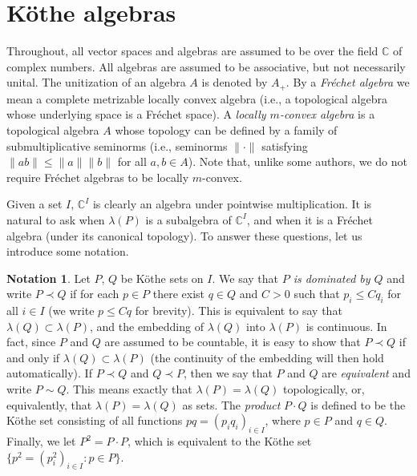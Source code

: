 \documentclass[12pt,reqno]{amsart}
\theoremstyle{definition}
\newtheorem*{notation}{Notation}
\begin{document}
\section{K\"othe algebras}
Throughout, all vector spaces and algebras are assumed to be over the field ${\mathbb C}$
of complex numbers. All algebras are assumed to be associative, but
not necessarily unital. The unitization of an algebra $A$ is denoted by $A_+$.
By a {\em Fr\'echet algebra} we mean a complete metrizable locally convex
algebra (i.e., a topological algebra whose underlying space
is a Fr\'echet space). A {\em locally $m$-convex algebra} is a topological
algebra $A$ whose topology can be defined by a family of submultiplicative
seminorms (i.e., seminorms $\|\cdot\|$ satisfying $\| ab\|\le \| a\| \| b\|$
for all $a,b\in A$). Note that, unlike some authors, we do not require
Fr\'echet algebras to be locally $m$-convex.

Given a set $I$, ${\mathbb C}^I$ is clearly an algebra under pointwise
multiplication. It is natural to ask when $\lambda(P)$ is a subalgebra of ${\mathbb C}^I$,
and when it is a Fr\'echet algebra (under its canonical topology).
To answer these questions, let us introduce some notation.

\begin{notation}
Let $P$, $Q$ be K\"othe sets on $I$. We say that {\em $P$ is dominated by $Q$}
and write $P\prec Q$ if for each $p\in P$ there exist $q\in Q$ and $C>0$ such that
$p_i\le Cq_i$ for all $i\in I$ (we write $p\le Cq$ for brevity).
This is equivalent to say that $\lambda(Q)\subset\lambda(P)$,
and the embedding of $\lambda(Q)$ into $\lambda(P)$ is continuous.
In fact, since $P$ and $Q$ are assumed to be countable, it is easy to show
that $P\prec Q$ if and only if $\lambda(Q)\subset\lambda(P)$
(the continuity of the embedding will then hold automatically).
If $P\prec Q$ and $Q\prec P$, then we say that
$P$ and $Q$ are {\em equivalent} and write $P\sim Q$.
This means exactly that $\lambda(P)=\lambda(Q)$ topologically, or, equivalently,
that $\lambda(P)=\lambda(Q)$ as sets.
The {\em product} $P\cdot Q$ is defined to be the K\"othe set consisting of
all functions $pq=(p_i q_i)_{i\in I}$, where $p\in P$ and $q\in Q$.
Finally, we let $P^2=P\cdot P$, which is equivalent to the K\"othe set
$\{ p^2=(p_i^2)_{i\in I} : p\in P\}$.
\end{notation}
\end{document}
